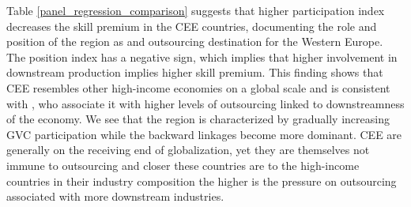 \documentclass[11pt]{article}
\begin{document}
Table \ref{panel_regression_comparison} suggests that higher participation index decreases the skill premium in the CEE countries, documenting the role and position of the region as and outsourcing destination for the Western Europe. The position index has a negative sign, which implies that higher involvement in downstream production implies higher skill premium. This finding shows that CEE resembles other high-income economies on a global scale and is consistent with \citet{coveri2024global}, who associate it with higher levels of outsourcing linked to downstreamness of the economy. We see that the region is characterized by gradually increasing GVC participation while the backward linkages become more dominant. CEE are generally on the receiving end of globalization, yet they are themselves not immune to outsourcing and closer these countries are to the high-income countries in their industry composition the higher is the pressure on outsourcing associated with more downstream industries.
\end{document}
